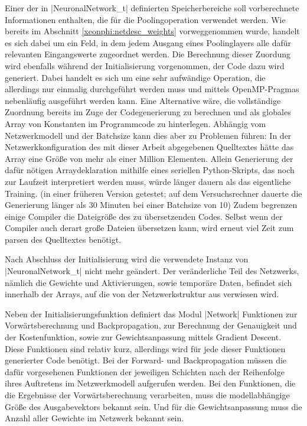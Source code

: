 \documentclass[../main.tex]{subfiles}
\begin{document}
Einer der in |NeuronalNetwork_t| definierten Speicherbereiche soll vorberechnete Informationen enthalten, die für die Poolingoperation verwendet werden. Wie bereits im Abschnitt \ref{xeonphi:netdesc_weights} vorweggenommen wurde, handelt es sich dabei um ein Feld, in dem jedem Ausgang eines Poolinglayers alle dafür relevanten Eingangswerte zugeordnet werden. Die Berechnung dieser Zuordung wird ebenfalls während der Initialisierung vorgenommen, der Code dazu wird generiert. Dabei handelt es sich um eine sehr aufwändige Operation, die allerdings nur einmalig durchgeführt werden muss und mittels OpenMP-Pragmas nebenläufig ausgeführt werden kann. Eine Alternative wäre, die vollständige Zuordnung bereits im Zuge der Codegenerierung zu berechnen und als globales Array von Konstanten im Programmcode zu hinterlegen. Abhängig vom Netzwerkmodell und der Batchsize kann dies aber zu Problemen führen: In der Netzwerkkonfiguration des mit dieser Arbeit abgegebenen Quelltextes hätte das Array eine Größe von mehr als einer Million Elementen. Allein Generierung der dafür nötigen Arraydeklaration mithilfe eines seriellen Python-Skripts, das noch zur Laufzeit interpretiert werden muss, würde länger dauern als das eigentliche Training. (in einer früheren Version getestet; auf dem Versuchsrechner dauerte die Generierung länger als 30 Minuten bei einer Batchsize von 10) Zudem begrenzen einige Compiler die Dateigröße des zu übersetzenden Codes. Selbst wenn der Compiler auch derart große Dateien übersetzen kann, wird erneut viel Zeit zum parsen des Quelltextes benötigt. 

Nach Abschluss der Initialisierung wird die verwendete Instanz von |NeuronalNetwork_t| nicht mehr geändert. Der veränderliche Teil des Netzwerks, nämlich die Gewichte und Aktivierungen, sowie temporäre Daten, befindet sich innerhalb der Arrays, auf die von der Netzwerkstruktur aus verwiesen wird. 

Neben der Initialisierungsfunktion definiert das Modul |Network| Funktionen zur Vorwärtsberechnung und Backpropagation, zur Berechnung der Genauigkeit und der Kostenfunktion, sowie zur Gewichtsanpassung mittels Gradient Descent. Diese Funktionen sind relativ kurz, allerdings wird für jede dieser Funktionen generierter Code benötigt. Bei der Forward- und Backpropagation müssen die dafür vorgesehenen Funktionen der jeweiligen Schichten nach der Reihenfolge ihres Auftretens im Netzwerkmodell aufgerufen werden. Bei den Funktionen, die die Ergebnisse der Vorwärtsberechnung verarbeiten, muss die modellabhängige Größe des Ausgabevektors bekannt sein. Und für die Gewichtsanpassung muss die Anzahl aller Gewichte im Netzwerk bekannt sein. 
\end{document}
